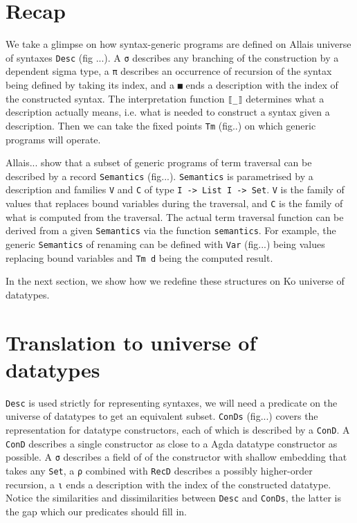 \documentclass[sigplan,review,fleqn]{acmart}
\begin{document}
\section{Recap}
We take a glimpse on how syntax-generic programs are defined on Allais universe of syntaxes \verb|Desc| (fig ...).
A \verb|σ| describes any branching of the construction by a dependent sigma type, a \verb|π| describes an occurrence of recursion of the syntax being defined by taking its index, and a \verb|■| ends a description with the index of the constructed syntax.
The interpretation function \verb|⟦_⟧| determines what a description actually means, i.e. what is needed to construct a syntax given a description.
Then we can take the fixed points \verb|Tm| (fig..) on which generic programs will operate.

Allais... show that a subset of generic programs of term traversal can be described by a record \verb|Semantics| (fig...).
\verb|Semantics| is parametrised by a description and families \verb|V| and \verb|C| of type \verb|I -> List I -> Set|.
\verb|V| is the family of values that replaces bound variables during the traversal, and \verb|C| is the family of what is computed from the traversal.
The actual term traversal function can be derived from a given \verb|Semantics| via the function \verb|semantics|.
For example, the generic \verb|Semantics| of renaming can be defined with \verb|Var| (fig...) being values replacing bound variables and \verb|Tm d| being the computed result.

In the next section, we show how we redefine these structures on Ko universe of datatypes. 


\section{Translation to universe of datatypes}
\verb|Desc| is used strictly for representing syntaxes, we will need a predicate on the universe of datatypes to get an equivalent subset.
\verb|ConDs| (fig...) covers the representation for datatype constructors, each of which is described by a \verb|ConD|.
A \verb|ConD| describes a single constructor as close to a Agda datatype constructor as possible.
A \verb|σ| describes a field of of the constructor with shallow embedding that takes any \verb|Set|, a \verb|ρ| combined with \verb|RecD| describes a possibly higher-order recursion, a \verb|ι| ends a description with the index of the constructed datatype.
Notice the similarities and dissimilarities between \verb|Desc| and \verb|ConDs|, the latter is the gap which our predicates should fill in. 
\end{document}
